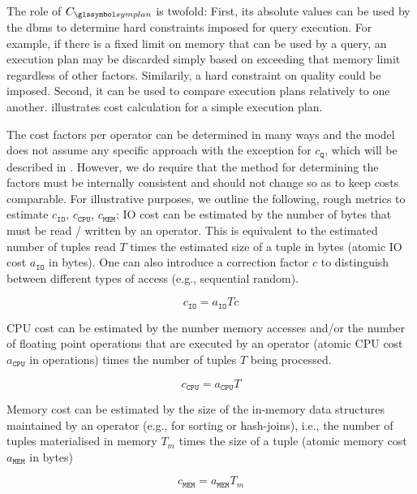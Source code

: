 The role of $C_{\symplan}$ is twofold: First, its absolute values can be used by the \acrshort{dbms} to determine hard constraints imposed for query execution. For example, if there is a fixed limit on memory that can be used by a query, an execution plan may be discarded simply based on exceeding that memory limit regardless of other factors. Similarily, a hard constraint on quality could be imposed. Second, it can be used to compare execution plans relatively to one another.  illustrates cost calculation for a simple execution plan.

The cost factors per operator can be determined in many ways and the model does not assume any specific approach with the exception for $c_{\mathtt{Q}}$, which will be described in . However, we do require that the method for determining the factors must be internally consistent and should not change so as to keep costs comparable. For illustrative purposes, we outline the following, rough metrics to estimate $c_{\mathtt{IO}}$, $c_{\mathtt{CPU}}$, $c_{\mathtt{MEM}}$: IO cost can be estimated by the number of bytes that must be read / written by an operator. This is equivalent to the estimated number of tuples read $T$ times the estimated size of a tuple in bytes (atomic IO cost $a_{\texttt{IO}}$ in bytes). One can also introduce a correction factor $c$ to distinguish between different types of access (e.g., sequential random).

\begin{equation*}
    c_{\mathtt{IO}} = a_{\texttt{IO}}Tc
\end{equation*}

CPU cost can be estimated by the number memory accesses and/or the number of floating point operations that are executed by an operator (atomic CPU cost $a_{\texttt{CPU}}$ in operations) times the number of tuples $T$ being processed.

\begin{equation*}
    c_{\mathtt{CPU}} = a_{\texttt{CPU}}T
\end{equation*}

Memory cost can be estimated by the size of the in-memory data structures maintained by an operator (e.g., for sorting or hash-joins), i.e., the number of tuples materialised in memory $T_m$ times the size of a tuple (atomic memory cost $a_{\texttt{MEM}}$ in bytes)

\begin{equation*}
    c_{\mathtt{MEM}} = a_{\texttt{MEM}}T_m
\end{equation*}

